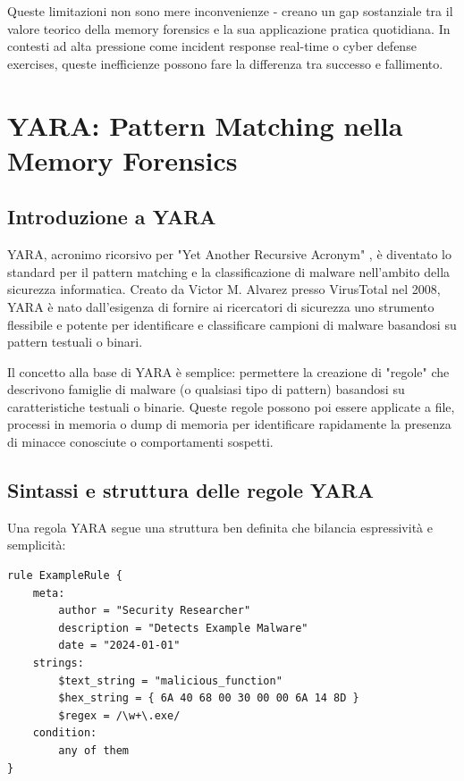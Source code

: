 Queste limitazioni non sono mere inconvenienze - creano un gap sostanziale tra il valore teorico della memory forensics e la sua applicazione pratica quotidiana. In contesti ad alta pressione come incident response real-time o cyber defense exercises, queste inefficienze possono fare la differenza tra successo e fallimento.

\section{YARA: Pattern Matching nella Memory Forensics}

\subsection{Introduzione a YARA}

YARA, acronimo ricorsivo per "Yet Another Recursive Acronym" \cite{yara2024}, è diventato lo standard per il pattern matching e la classificazione di malware nell'ambito della sicurezza informatica. Creato da Victor M. Alvarez presso VirusTotal nel 2008, YARA è nato dall'esigenza di fornire ai ricercatori di sicurezza uno strumento flessibile e potente per identificare e classificare campioni di malware basandosi su pattern testuali o binari.

Il concetto alla base di YARA è semplice: permettere la creazione di "regole" che descrivono famiglie di malware (o qualsiasi tipo di pattern) basandosi su caratteristiche testuali o binarie. Queste regole possono poi essere applicate a file, processi in memoria o dump di memoria per identificare rapidamente la presenza di minacce conosciute o comportamenti sospetti.

\subsection{Sintassi e struttura delle regole YARA}

Una regola YARA segue una struttura ben definita che bilancia espressività e semplicità:

\begin{verbatim}
rule ExampleRule {
    meta:
        author = "Security Researcher"
        description = "Detects Example Malware"
        date = "2024-01-01" 
    strings:
        $text_string = "malicious_function"
        $hex_string = { 6A 40 68 00 30 00 00 6A 14 8D }
        $regex = /\w+\.exe/
    condition:
        any of them
}
\end{verbatim}


